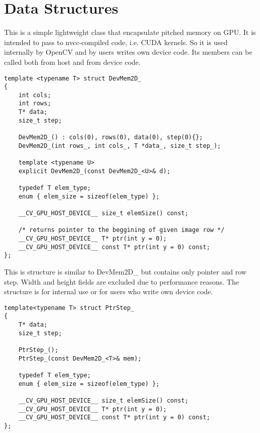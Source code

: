 \section{Data Structures}


\label{cppfunc.gpu.DevMem2D}

This is a simple lightweight class that encapsulate pitched memory on GPU. It is intended to pass to nvcc-compiled code, i.e. CUDA kernels. So it is used internally by OpenCV and by users writes own device code. Its members can be called both from host and from device code.

\begin{lstlisting}
template <typename T> struct DevMem2D_
{            
    int cols;
    int rows;
    T* data;
    size_t step;
	
    DevMem2D_() : cols(0), rows(0), data(0), step(0){};	
    DevMem2D_(int rows_, int cols_, T *data_, size_t step_);
			
    template <typename U>            
    explicit DevMem2D_(const DevMem2D_<U>& d);
	
    typedef T elem_type;
    enum { elem_size = sizeof(elem_type) };

    __CV_GPU_HOST_DEVICE__ size_t elemSize() const;

    /* returns pointer to the beggining of given image row */
    __CV_GPU_HOST_DEVICE__ T* ptr(int y = 0);
    __CV_GPU_HOST_DEVICE__ const T* ptr(int y = 0) const;
};
\end{lstlisting}


\label{cppfunc.gpu.PtrStep}

This is structure is similar to DevMem2D\_ but contains only pointer and row step. Width and height fields are excluded due to performance reasons. The structure is for internal use or for users who write own device code.

\begin{lstlisting}
template<typename T> struct PtrStep_
{
	T* data;
	size_t step;

	PtrStep_();
	PtrStep_(const DevMem2D_<T>& mem);

	typedef T elem_type;
	enum { elem_size = sizeof(elem_type) };

	__CV_GPU_HOST_DEVICE__ size_t elemSize() const;
	__CV_GPU_HOST_DEVICE__ T* ptr(int y = 0);
	__CV_GPU_HOST_DEVICE__ const T* ptr(int y = 0) const;
};

\end{lstlisting}

